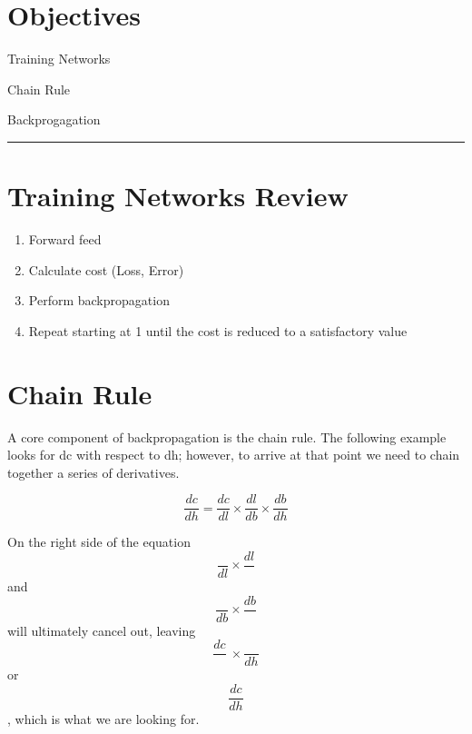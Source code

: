 
\section*{Objectives}
\begin{outline}
    \item Training Networks
    \item Chain Rule
    \item Backprogagation
\end{outline}

\rule[0.0051in]{\textwidth}{0.00025in}


\section{Training Networks Review}

\begin{enumerate}
    \item Forward feed
    \item Calculate cost (Loss, Error)
    \item Perform backpropagation
    \item Repeat starting at 1 until the cost is reduced to a satisfactory value
\end{enumerate}
%



\section{Chain Rule}

A core component of backpropagation is the chain rule.
The following example looks for dc with respect to dh; however, to arrive at that point we need to chain together a series of derivatives.

\[
\frac{dc}{dh} = \frac{dc}{dl} \times \frac{dl}{db} \times \frac{db}{dh}
\]

On the right side of the equation \[\frac{}{dl} \times \frac{dl}{}\] and \[\frac{}{db} \times \frac{db}{}\]  will ultimately cancel out, leaving \[\frac{dc}{}\ \times \frac{}{dh}\] or \[\frac{dc}{dh}\], which is what we are looking for. 

